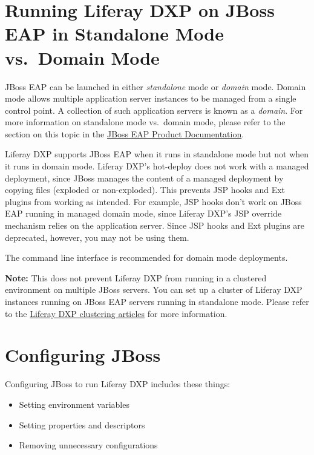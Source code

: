 \section{Running Liferay DXP on JBoss EAP in Standalone Mode vs.~Domain
Mode}\label{running-liferay-dxp-on-jboss-eap-in-standalone-mode-vs.-domain-mode}

JBoss EAP can be launched in either \emph{standalone} mode or
\emph{domain} mode. Domain mode allows multiple application server
instances to be managed from a single control point. A collection of
such application servers is known as a \emph{domain}. For more
information on standalone mode vs.~domain mode, please refer to the
section on this topic in the
\href{https://access.redhat.com/documentation/en-us/red_hat_jboss_enterprise_application_platform/7.1/html/introduction_to_jboss_eap/overview_of_jboss_eap\#operating_modes}{JBoss
EAP Product Documentation}.

Liferay DXP supports JBoss EAP when it runs in standalone mode but not
when it runs in domain mode. Liferay DXP's hot-deploy does not work with
a managed deployment, since JBoss manages the content of a managed
deployment by copying files (exploded or non-exploded). This prevents
JSP hooks and Ext plugins from working as intended. For example, JSP
hooks don't work on JBoss EAP running in managed domain mode, since
Liferay DXP's JSP override mechanism relies on the application server.
Since JSP hooks and Ext plugins are deprecated, however, you may not be
using them.

The command line interface is recommended for domain mode deployments.

\noindent\hrulefill

\textbf{Note:} This does not prevent Liferay DXP from running in a
clustered environment on multiple JBoss servers. You can set up a
cluster of Liferay DXP instances running on JBoss EAP servers running in
standalone mode. Please refer to the
\href{/docs/7-2/deploy/-/knowledge_base/d/liferay-clustering}{Liferay
DXP clustering articles} for more information.

\noindent\hrulefill

\section{Configuring JBoss}\label{configuring-jboss}

Configuring JBoss to run Liferay DXP includes these things:

\begin{itemize}
\tightlist
\item
  Setting environment variables
\item
  Setting properties and descriptors
\item
  Removing unnecessary configurations
\end{itemize}

